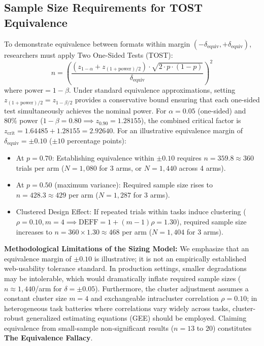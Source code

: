 \documentclass[11pt,a4paper]{article}
\begin{document}
\subsection{Sample Size Requirements for TOST Equivalence}
\label{sec:tost}
To demonstrate equivalence between formats within margin $(-\delta_{\text{equiv}}, +\delta_{\text{equiv}})$, researchers must apply Two One-Sided Tests (TOST):
\begin{equation}
n = \left(\frac{(z_{1-\alpha} + z_{(1+\text{power})/2}) \cdot \sqrt{2 \cdot p \cdot (1 - p)}}{\delta_{\text{equiv}}}\right)^2
\end{equation}
where $\text{power} = 1 - \beta$. Under standard equivalence approximations, setting $z_{(1+\text{power})/2} = z_{1 - \beta/2}$ provides a conservative bound ensuring that each one-sided test simultaneously achieves the nominal power. For $\alpha = 0.05$ (one-sided) and $80\%$ power ($1-\beta = 0.80 \implies z_{0.90} = 1.28155$), the combined critical factor is $z_{\text{crit}} = 1.64485 + 1.28155 = 2.92640$. For an illustrative equivalence margin of $\delta_{\text{equiv}} = \pm 0.10$ ($\pm 10$ percentage points):
\begin{itemize}
    \item At $p = 0.70$: Establishing equivalence within $\pm 0.10$ requires $n = 359.8 \approx 360$ trials per arm ($N = 1,080$ for 3 arms, or $N = 1,440$ across 4 arms).
    \item At $p = 0.50$ (maximum variance): Required sample size rises to $n = 428.3 \approx 429$ per arm ($N = 1,287$ for 3 arms).
    \item Clustered Design Effect: If repeated trials within tasks induce clustering ($\rho = 0.10, m = 4 \implies \text{DEFF} = 1 + (m-1)\rho = 1.30$), required sample size increases to $n = 360 \times 1.30 \approx 468$ per arm ($N = 1,404$ for 3 arms).
\end{itemize}
\textbf{Methodological Limitations of the Sizing Model:} We emphasize that an equivalence margin of $\pm 0.10$ is illustrative; it is not an empirically established web-usability tolerance standard. In production settings, smaller degradations may be intolerable, which would dramatically inflate required sample sizes ($n \approx 1,440$/arm for $\delta = \pm 0.05$). Furthermore, the cluster adjustment assumes a constant cluster size $m=4$ and exchangeable intracluster correlation $\rho = 0.10$; in heterogeneous task batteries where correlations vary widely across tasks, cluster-robust generalized estimating equations (GEE) should be employed. Claiming equivalence from small-sample non-significant results ($n=13$ to $20$) constitutes \textbf{The Equivalence Fallacy}.
\end{document}
